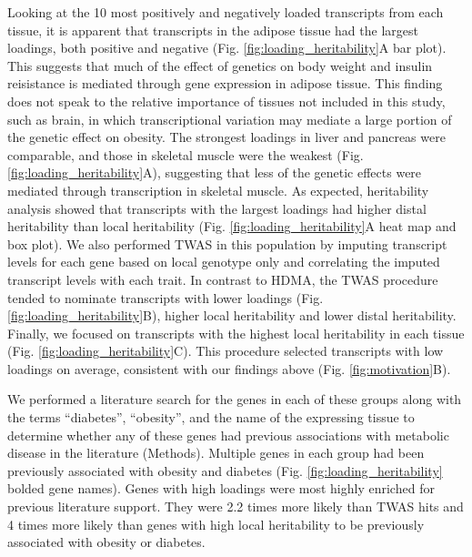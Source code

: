 \documentclass[
]{article}
\begin{document}
Looking at the 10 most positively and negatively loaded transcripts from
each tissue, it is apparent that transcripts in the adipose tissue had
the largest loadings, both positive and negative (Fig.
\ref{fig:loading_heritability}A bar plot). This suggests that much of
the effect of genetics on body weight and insulin reisistance is
mediated through gene expression in adipose tissue. This finding does
not speak to the relative importance of tissues not included in this
study, such as brain, in which transcriptional variation may mediate a
large portion of the genetic effect on obesity. The strongest loadings
in liver and pancreas were comparable, and those in skeletal muscle were
the weakest (Fig. \ref{fig:loading_heritability}A), suggesting that less
of the genetic effects were mediated through transcription in skeletal
muscle. As expected, heritability analysis showed that transcripts with
the largest loadings had higher distal heritability than local
heritability (Fig. \ref{fig:loading_heritability}A heat map and box
plot). We also performed TWAS in this population by imputing transcript
levels for each gene based on local genotype only and correlating the
imputed transcript levels with each trait. In contrast to HDMA, the TWAS
procedure tended to nominate transcripts with lower loadings (Fig.
\ref{fig:loading_heritability}B), higher local heritability and lower
distal heritability. Finally, we focused on transcripts with the highest
local heritability in each tissue (Fig.
\ref{fig:loading_heritability}C). This procedure selected transcripts
with low loadings on average, consistent with our findings above (Fig.
\ref{fig:motivation}B).

We performed a literature search for the genes in each of these groups
along with the terms ``diabetes'', ``obesity'', and the name of the
expressing tissue to determine whether any of these genes had previous
associations with metabolic disease in the literature (Methods).
Multiple genes in each group had been previously associated with obesity
and diabetes (Fig. \ref{fig:loading_heritability} bolded gene names).
Genes with high loadings were most highly enriched for previous
literature support. They were 2.2 times more likely than TWAS hits and 4
times more likely than genes with high local heritability to be
previously associated with obesity or diabetes.

\pagebreak
\end{document}
